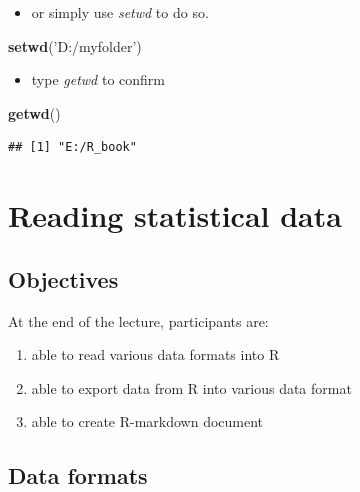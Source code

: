\documentclass[]{book}
\newenvironment{Shaded}{\begin{snugshade}}{\end{snugshade}}
\newcommand{\KeywordTok}[1]{\textcolor[rgb]{0.13,0.29,0.53}{\textbf{#1}}}
\newcommand{\StringTok}[1]{\textcolor[rgb]{0.31,0.60,0.02}{#1}}
\newcommand{\NormalTok}[1]{#1}
\providecommand{\tightlist}{%
  \setlength{\itemsep}{0pt}\setlength{\parskip}{0pt}}
\theoremstyle{definition}
\theoremstyle{definition}
\theoremstyle{remark}
\begin{document}
\begin{itemize}
\tightlist
\item
  or simply use \emph{setwd} to do so.
\end{itemize}

\begin{Shaded}
\begin{Highlighting}[]
\KeywordTok{setwd}\NormalTok{(}\StringTok{'D:/myfolder'}\NormalTok{)}
\end{Highlighting}
\end{Shaded}

\begin{itemize}
\tightlist
\item
  type \emph{getwd} to confirm
\end{itemize}

\begin{Shaded}
\begin{Highlighting}[]
\KeywordTok{getwd}\NormalTok{()}
\end{Highlighting}
\end{Shaded}

\begin{verbatim}
## [1] "E:/R_book"
\end{verbatim}

\chapter{Reading statistical data}\label{reading-statistical-data}

\section{Objectives}\label{objectives-1}

At the end of the lecture, participants are:

\begin{enumerate}
\def\labelenumi{\arabic{enumi}.}
\tightlist
\item
  able to read various data formats into R
\item
  able to export data from R into various data format
\item
  able to create R-markdown document
\end{enumerate}

\section{Data formats}\label{data-formats}
\end{document}
